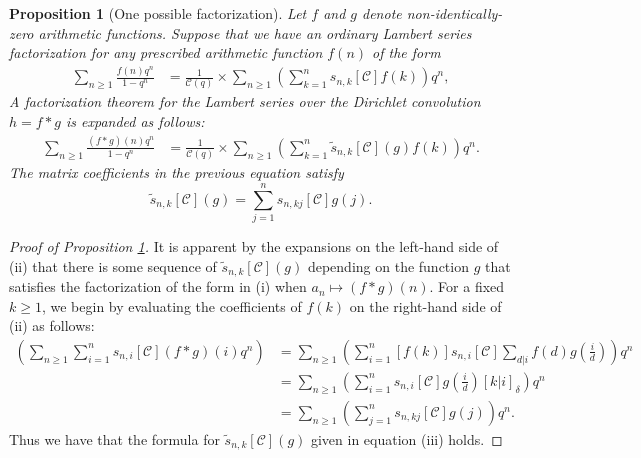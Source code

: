 \documentclass[12pt,reqno,a4letter]{article}
\numberwithin{figure}{section}
\numberwithin{table}{section}
\numberwithin{equation}{section}
\newcommand{\Iverson}[1]{\ensuremath{\left[#1\right]_{\delta}}}
\theoremstyle{plain}
\newtheorem{prop}[theorem]{Proposition}
\numberwithin{theorem}{section}
\theoremstyle{definition}
\begin{document}
\begin{prop}[One possible factorization] 
\label{prop_OnePossibleLSFact} 
Let $f$ and $g$ denote non-identically-zero arithmetic functions. 
Suppose that we have an ordinary Lambert series factorization for any prescribed 
arithmetic function $f(n)$ of the form 
\begin{align*} 
\tag{i}
\sum_{n \geq 1} \frac{f(n) q^n}{1-q^n} & = \frac{1}{\mathcal{C}(q)} \times 
     \sum_{n \geq 1} \left(\sum_{k=1}^n 
     s_{n,k}[\mathcal{C}] f(k) \right) q^n, 
\end{align*} 
A factorization theorem for the Lambert series over the 
Dirichlet convolution $h = f \ast g$ is expanded as follows: 
\begin{align*} 
\tag{ii} 
\sum_{n \geq 1} \frac{(f \ast g)(n) q^n}{1-q^n} & = \frac{1}{\mathcal{C}(q)} \times 
     \sum_{n \geq 1} \left(\sum_{k=1}^n 
     \widetilde{s}_{n,k}[\mathcal{C}](g) f(k) \right) q^n. 
\end{align*} 
The matrix coefficients in the previous equation satisfy 
\begin{equation*} 
\tag{iii}
\widetilde{s}_{n,k}[\mathcal{C}](g) = \sum_{j=1}^n s_{n,kj}[\mathcal{C}] g(j). 
\end{equation*} 
\end{prop} 
\begin{proof}[Proof of Proposition \ref{prop_OnePossibleLSFact}] 
It is apparent by the expansions on the left-hand side of (ii) that there is some sequence of 
$\widetilde{s}_{n,k}[\mathcal{C}](g)$ depending on the function $g$ that satisfies the factorization of the 
form in (i) when $a_n \mapsto (f \ast g)(n)$. 
For a fixed $k \geq 1$, we begin by evaluating the coefficients of $f(k)$ on the 
right-hand side of (ii) as follows: 
\begin{align*} 
[f(k)] \left(\sum_{n \geq 1} \sum_{i=1}^n s_{n,i}[\mathcal{C}] (f \ast g)(i) q^n\right) 
     & = \sum_{n \geq 1} \left(\sum_{i=1}^n [f(k)] s_{n,i}[\mathcal{C}] \sum_{d|i} f(d) 
     g\left(\frac{i}{d}\right)\right) q^n \\ 
     & = \sum_{n \geq 1} \left(\sum_{i=1}^n s_{n,i}[\mathcal{C}] g\left(\frac{i}{d}\right) 
     \Iverson{k|i}\right) q^n \\ 
     & = \sum_{n \geq 1} \left(\sum_{j=1}^n s_{n,kj}[\mathcal{C}] g(j)\right) q^n. 
\end{align*} 
Thus we have that the formula for $\widetilde{s}_{n,k}[\mathcal{C}](g)$ given in equation 
(iii) holds. 
\end{proof} 
\end{document}
